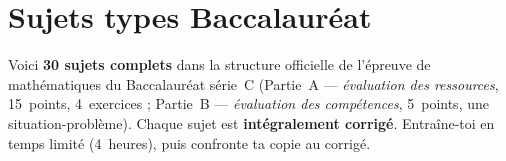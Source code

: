\chapter{Sujets types Baccalauréat}

\noindent Voici \textbf{30 sujets complets} dans la structure officielle de l'épreuve de
mathématiques du Baccalauréat série~C (Partie~A — \emph{évaluation des ressources},
15~points, 4~exercices ; Partie~B — \emph{évaluation des compétences}, 5~points,
une situation-problème). Chaque sujet est \textbf{intégralement corrigé}. Entraîne-toi
en temps limité (4~heures), puis confronte ta copie au corrigé.


\clearpage

\clearpage

\clearpage

\clearpage

\clearpage

\clearpage

\clearpage

\clearpage

\clearpage

\clearpage

\clearpage

\clearpage

\clearpage

\clearpage

\clearpage

\clearpage

\clearpage

\clearpage

\clearpage

\clearpage

\clearpage

\clearpage

\clearpage

\clearpage

\clearpage

\clearpage

\clearpage

\clearpage

\clearpage

\clearpage
